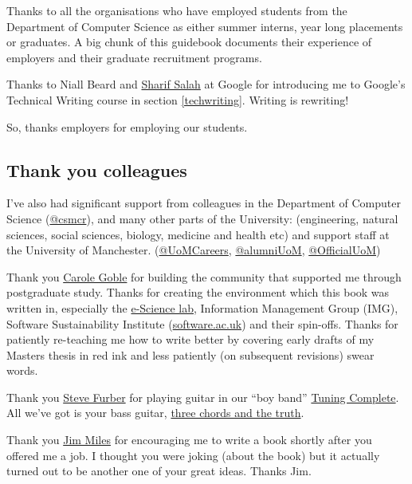 \documentclass[
]{book}
\begin{document}
Thanks to all the organisations who have employed students from the Department of Computer Science as either summer interns, year long placements or graduates. A big chunk of this guidebook documents their experience of employers and their graduate recruitment programs.

Thanks to Niall Beard and \href{https://github.com/sharifsalah}{Sharif Salah} at Google for introducing me to Google's Technical Writing course in section \ref{techwriting}. Writing is rewriting!

So, thanks employers for employing our students. 🙏

\hypertarget{colleagues}{%
\subsection{Thank you colleagues}\label{colleagues}}

I've also had significant support from colleagues in the Department of Computer Science (\href{https://twitter.com/csmcr}{@csmcr}), and many other parts of the University: (engineering, natural sciences, social sciences, biology, medicine and health etc) and support staff at the University of Manchester. (\href{https://twitter.com/UoMCareers}{@UoMCareers}, \href{https://twitter.com/alumniUoM}{@alumniUoM}, \href{https://twitter.com/OfficialUoM}{@OfficialUoM})

Thank you \href{https://en.wikipedia.org/wiki/Carole_Goble}{Carole Goble} for building the community that supported me through postgraduate study. Thanks for creating the environment which this book was written in, especially the \href{https://esciencelab.org.uk/}{e-Science lab}, Information Management Group (IMG), Software Sustainability Institute (\href{https://software.ac.uk/}{software.ac.uk}) and their spin-offs. Thanks for patiently re-teaching me how to write better by covering early drafts of my Masters thesis in red ink and less patiently (on subsequent revisions) swear words. 🤬

Thank you \href{https://en.wikipedia.org/wiki/Steve_Furber}{Steve Furber} for playing guitar in our ``boy band'' \href{https://personalpages.manchester.ac.uk/staff/duncan.hull/research\#tuningcomplete}{Tuning Complete}. All we've got is your bass guitar, \href{https://en.wikipedia.org/wiki/Three_Chords_and_the_Truth}{three chords and the truth}. \citep{harlan, allalongthewatchtower} 🎸

Thank you \href{https://en.wikipedia.org/wiki/James_John_Miles}{Jim Miles} for encouraging me to write a book shortly after you offered me a job. I thought you were joking (about the book) but it actually turned out to be another one of your great ideas. Thanks Jim. 🙏
\end{document}
